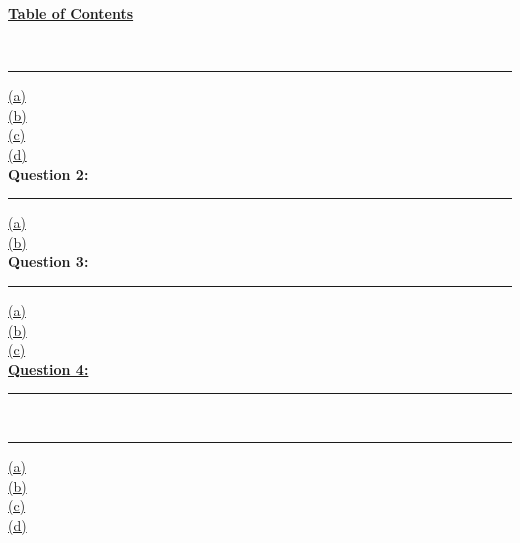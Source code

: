 \documentclass[12pt]{article}
\begin{document}
\begin{center}
    \hypertarget{toc}{\LARGE \noindent \underline{\textbf{Table of Contents}}}\\
\end{center}

\vspace{1mm}
\hrule
\vspace{1mm}
\noindent
\hyperlink{1.1}{(a)}\\
\hyperlink{1.2}{(b)}\\
\hyperlink{1.3}{(c)}\\
\hyperlink{1.4}{(d)}\\

\noindent \textbf{Question 2:}
\vspace{1mm}
\hrule
\vspace{1mm}
\hyperlink{2.1}{(a)}\\
\hyperlink{2.2}{(b)}\\

\noindent \textbf{Question 3:}
\vspace{1mm}
\hrule
\vspace{1mm}
\noindent
\hyperlink{3.1}{(a)}\\
\hyperlink{3.2}{(b)}\\
\hyperlink{3.3}{(c)}\\

\noindent \hyperlink{4}{\textbf{Question 4:}}
\vspace{1mm}
\hrule
\vspace{1mm} \leavevmode \\

\vspace{1mm}
\hrule
\vspace{1mm}
\noindent
\hyperlink{5.1}{(a)}\\
\hyperlink{5.2}{(b)}\\
\hyperlink{5.3}{(c)}\\
\hyperlink{5.4}{(d)}\\

\newpage
\end{document}
